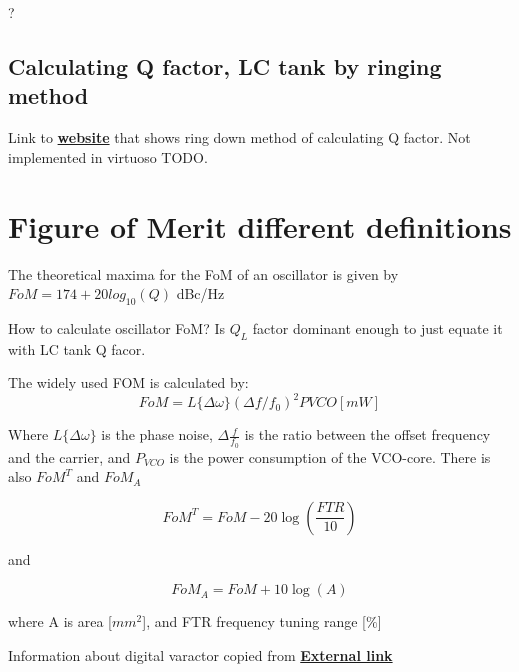 \documentclass{article}
\begin{document}
\begin{question}
	?
\end{question}

\subsection{Calculating Q factor‚ LC tank by ringing method}

Link to \href{https://www.giangrandi.ch/electronics/ringdownq/ringdownq.shtml}{\textbf{website}} that shows ring down method of calculating Q factor. Not implemented in virtuoso TODO.


\section{Figure of Merit different definitions}

\begin{info} %
	The theoretical maxima for the FoM of an oscillator is given by $FoM=174+20log_{10}(Q)$ dBc/Hz
\end{info}

How to calculate oscillator FoM? Is $Q_L$ factor dominant enough to just equate it with LC tank Q facor.

The widely used FOM is calculated by:
\begin{equation}
	FoM = L\{ \Delta \omega \}( \Delta f/f_0)^2 PVCO [mW]
\end{equation}

Where $L\{\Delta \omega\}$ is the phase noise, $ \Delta \frac{f}{f_0}$ is the ratio between the offset frequency and the carrier, and $P_{VCO}$ is the power consumption of the VCO-core. There is also $FoM^T$ and $FoM_A$ 

\begin{equation}
	FoM^T = FoM - 20 \log (\dfrac{FTR}{10})
\end{equation}

and 

\begin{equation}
	FoM_A = FoM + 10 \log (A)
\end{equation}

where A is area [$mm^2$], and FTR frequency tuning range [$\%$]

Information about digital varactor copied from \href{https://www.doe.carleton.ca/~ddchen/Tutorials/DCO.pdf}{\textbf{External link}}
\end{document}
